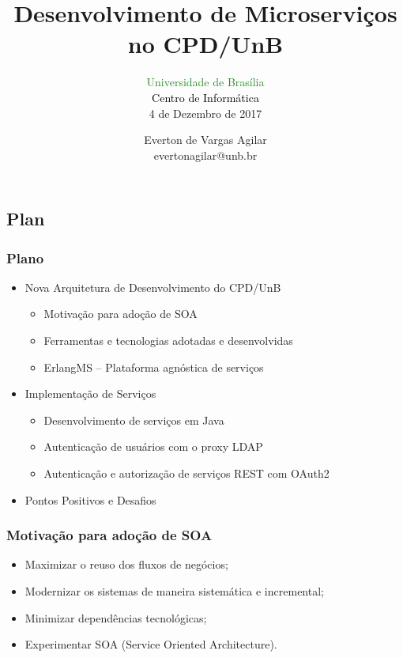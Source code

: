 \documentclass{beamer}
\title{Desenvolvimento de Microserviços \\ no CPD/UnB }
\subtitle{ \textcolor{forestgreen}{Universidade de Brasília} \\
			\textcolor{black}{Centro de Informática} \\
			4 de Dezembro de 2017
}
\author{Everton de Vargas Agilar \\
		evertonagilar@unb.br
}
\begin{document}
\begin{frame}
  \titlepage
\end{frame}








\subsection{Plan}

\begin{frame}
  \frametitle{Plano}

    \begin{itemize}

	    \item<1-> Nova Arquitetura de Desenvolvimento do CPD/UnB
		    \begin{itemize}
				\item<1->Motivação para adoção de SOA
				\item<1->Ferramentas e tecnologias adotadas e desenvolvidas
				\item<1->ErlangMS -- Plataforma agnóstica de serviços
			\end{itemize}

  	  	\item<1-> Implementação de Serviços
		    \begin{itemize}
				\item<1->Desenvolvimento de serviços em Java
				\item<1->Autenticação de usuários com o proxy LDAP
				\item<1->Autenticação e autorização de serviços REST com OAuth2
  		     \end{itemize}
 	  
	   	\item<1-> Pontos Positivos e Desafios
	   	  
    \end{itemize}

\end{frame}



\begin{frame}
\frametitle{Motivação para adoção de SOA}

\begin{itemize}
	\item<1->Maximizar o reuso dos fluxos de negócios;
	\item<1->Modernizar os sistemas de maneira sistemática e incremental;
	\item<1->Minimizar dependências tecnológicas; 
	\item<1->Experimentar SOA (Service Oriented Architecture).
\end{itemize}

\end{frame}
\end{document}
